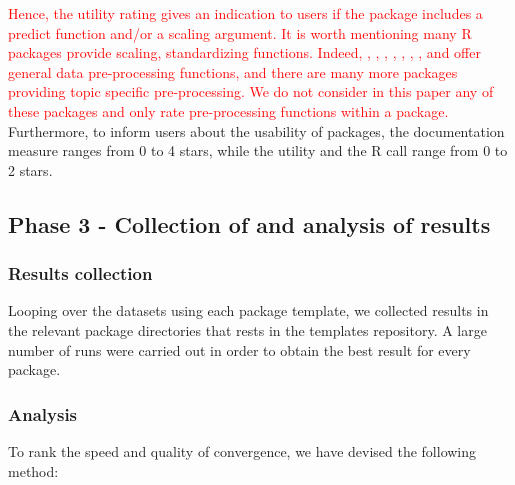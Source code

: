 \textcolor{red}{
Hence, the utility rating gives an indication to users if the package
includes a predict function and/or a scaling argument. 
It is worth mentioning many \textsf{R} packages provide scaling, standardizing
functions. Indeed, , , ,
, , , 
, and  offer general data pre-processing
functions, and there are many more packages providing topic specific pre-processing.
We do not consider in this paper any of these packages and only rate
pre-processing functions within a package.} Furthermore, to inform users
about the usability of packages, the documentation measure ranges from 0
to 4 stars, while the utility and the \textsf{R} call range from 0 to 2
stars.

\hypertarget{phase-3---collection-of-and-analysis-of-results}{%
\subsection{Phase 3 - Collection of and analysis of
results}\label{phase-3---collection-of-and-analysis-of-results}}

\hypertarget{results-collection}{%
\subsubsection{Results collection}\label{results-collection}}

Looping over the datasets using each package template, we collected
results in the relevant package directories that rests in the templates
repository. A large number of runs were carried out in order to obtain
the best result for every package.

\hypertarget{analysis}{%
\subsubsection{Analysis}\label{analysis}}

To rank the speed and quality of convergence, we have devised the
following method:

